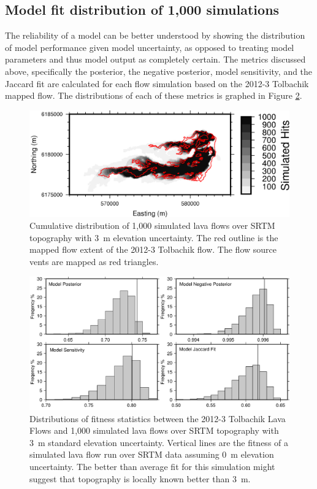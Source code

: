 \documentclass[12pt,letter]{article}
\begin{document}
		\subsection{Model fit distribution of 1,000 simulations}
		The reliability of a model can be better understood by showing the distribution of model performance given model uncertainty, as opposed to treating model parameters and thus model output as completely certain. The metrics discussed above, specifically the posterior, the negative posterior, model sensitivity, and the Jaccard fit are calculated for each flow simulation based on the 2012-3 Tolbachik mapped flow. The distributions of each of these metrics is graphed in Figure \ref{fig:MC_dist}.

\begin{figure}
\centering
\includegraphics[width=0.7\linewidth]{figures/MC_map}
\caption{Cumulative distribution of 1,000 simulated lava flows over SRTM topography with 3~m elevation uncertainty. The red outline is the mapped flow extent of the 2012-3 Tolbachik flow. The flow source vents are mapped as red triangles.}
\label{fig:MC_map}
\end{figure}

\begin{figure}
\centering
\includegraphics[width=0.7\linewidth]{figures/bayes_graphs}
\caption{Distributions of fitness statistics between the 2012-3 Tolbachik Lava Flows and 1,000 simulated lava flows over SRTM topography with 3~m standard elevation uncertainty. Vertical lines are the fitness of a simulated lava flow run over SRTM data assuming 0~m elevation uncertainty. The better than average fit for this simulation might suggest that topography is locally known better than 3~m.}
\label{fig:MC_dist}
\end{figure}
\end{document}
